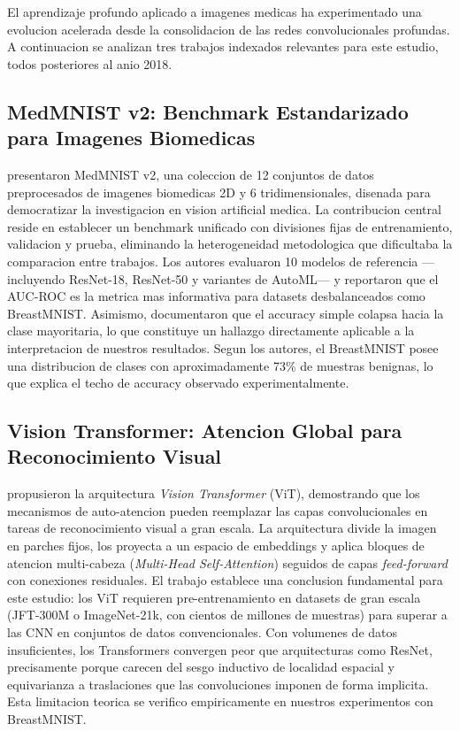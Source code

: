 \documentclass[12pt, a4paper]{article}
\begin{document}
El aprendizaje profundo aplicado a imagenes medicas ha experimentado una evolucion acelerada desde la consolidacion de las redes convolucionales profundas. A continuacion se analizan tres trabajos indexados relevantes para este estudio, todos posteriores al anio 2018.

\subsection{MedMNIST v2: Benchmark Estandarizado para Imagenes Biomedicas}

\citet{yang2023medmnist} presentaron MedMNIST v2, una coleccion de 12 conjuntos de datos preprocesados de imagenes biomedicas 2D y 6 tridimensionales, disenada para democratizar la investigacion en vision artificial medica. La contribucion central reside en establecer un benchmark unificado con divisiones fijas de entrenamiento, validacion y prueba, eliminando la heterogeneidad metodologica que dificultaba la comparacion entre trabajos. Los autores evaluaron 10 modelos de referencia ---incluyendo ResNet-18, ResNet-50 y variantes de AutoML--- y reportaron que el AUC-ROC es la metrica mas informativa para datasets desbalanceados como BreastMNIST. Asimismo, documentaron que el accuracy simple colapsa hacia la clase mayoritaria, lo que constituye un hallazgo directamente aplicable a la interpretacion de nuestros resultados. Segun los autores, el BreastMNIST posee una distribucion de clases con aproximadamente 73\% de muestras benignas, lo que explica el techo de accuracy observado experimentalmente.

\subsection{Vision Transformer: Atencion Global para Reconocimiento Visual}

\citet{dosovitskiy2021vit} propusieron la arquitectura \textit{Vision Transformer} (ViT), demostrando que los mecanismos de auto-atencion pueden reemplazar las capas convolucionales en tareas de reconocimiento visual a gran escala. La arquitectura divide la imagen en parches fijos, los proyecta a un espacio de embeddings y aplica bloques de atencion multi-cabeza (\textit{Multi-Head Self-Attention}) seguidos de capas \textit{feed-forward} con conexiones residuales. El trabajo establece una conclusion fundamental para este estudio: los ViT requieren pre-entrenamiento en datasets de gran escala (JFT-300M o ImageNet-21k, con cientos de millones de muestras) para superar a las CNN en conjuntos de datos convencionales. Con volumenes de datos insuficientes, los Transformers convergen peor que arquitecturas como ResNet, precisamente porque carecen del sesgo inductivo de localidad espacial y equivarianza a traslaciones que las convoluciones imponen de forma implicita. Esta limitacion teorica se verifico empiricamente en nuestros experimentos con BreastMNIST.
\end{document}
